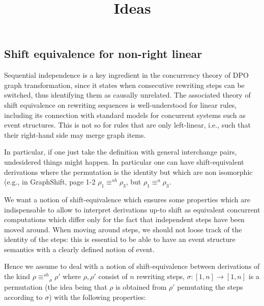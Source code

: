 \documentclass{llncs}
\title{Ideas}
\newcommand{\interval}[2][1]{\ensuremath{[{#1},{#2}]}}
\newcommand{\shifteq}[1][]{\ensuremath{\mathrel{{\equiv}^\mathit{sh}_{#1}}}}
\begin{document}
\maketitle



  
\subsection*{Shift equivalence for non-right linear}

Sequential independence is a key ingredient in the concurrency theory of DPO graph transformation, since it states when consecutive rewriting steps can be switched, thus 
identifying them as causally unrelated. The associated theory of shift equivalence on rewriting sequences is well-understood for linear rules, including its 
connection with standard models for concurrent systems such as event structures. 
%
This is not so for rules that are only left-linear, i.e., such that
their right-hand side may merge graph items.


In particular, if one just take the definition with general
interchange pairs, undesidered things might happen. In particular one
can have shift-equivalent derivations where the permutation is the
identity but which are non isomorphic (e.g., in GraphShift, page 1-2
$\rho_1 \shifteq \rho_3$, but $\rho_1 \equiv^{a} \rho_3$.
  
We want a notion of shift-equivalence which ensures some properties
which are indispensable to allow to interpret derivations up-to shift
as equivalent concurrent computations which differ only for the fact
that independent steps have been moved around. When moving around steps, we should not loose track of the identity of the steps: this is essential to be able to have an event structure semantics with a clearly defined notion of event.


Hence we assume to deal
with a notion of shift-equivalence between derivations of the kind
$\rho \shifteq_\sigma \rho'$ where $\rho, \rho'$ consist of $n$
rewriting steps, $\sigma: \interval{n} \to \interval{n}$ is a
permutation (the idea being that $\rho$ is obtained from $\rho'$
pemutating the steps according to $\sigma$) with the following
properties:
\end{document}
